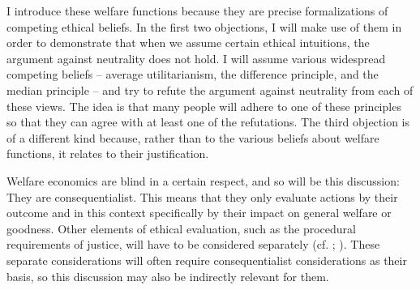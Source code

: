 I introduce these welfare functions because they are precise formalizations of competing ethical beliefs. In the first two objections, I will make use of them in order to demonstrate that when we assume certain ethical intuitions, the argument against neutrality does not hold. I will assume various widespread competing beliefs – average utilitarianism, the difference principle, and the median principle – and try to refute the argument against neutrality from each of these views. The idea is that many people will adhere to one of these principles so that they can agree with at least one of the refutations. The third objection is of a different kind because, rather than to the various beliefs about welfare functions, it relates to their justification.  

Welfare economics are blind in a certain respect, and so will be this discussion: They are consequentialist. This means that they only evaluate actions by their outcome and in this context specifically by their impact on general welfare or goodness. Other elements of ethical evaluation, such as the procedural requirements of justice, will have to be considered separately (cf. ; ). These separate considerations will often require consequentialist considerations as their basis, so this discussion may also be indirectly relevant for them.  